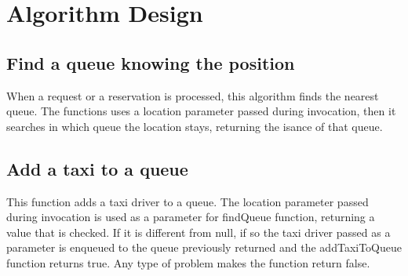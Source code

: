 \section{Algorithm Design}
\label{sec:algo}
\subsection{Find a queue knowing the position}
\begin{algorithm}[H]
	 {
		\BlankLine
		\;
	}
\end{algorithm}
When a request or a reservation is processed, this algorithm finds the nearest queue. The functions uses a location parameter passed during invocation, then it searches in which queue the location stays, returning the isance of that queue.
\subsection{Add a taxi to a queue}
\begin{algorithm}[H]
\end{algorithm}
This function adds a taxi driver to a queue. The location parameter passed during invocation is used as a parameter for findQueue function, returning a value that is checked. If it is different from null, if so the taxi driver passed as a parameter is enqueued to the queue previously returned and the addTaxiToQueue function returns true. Any type of problem makes the function return false.  
